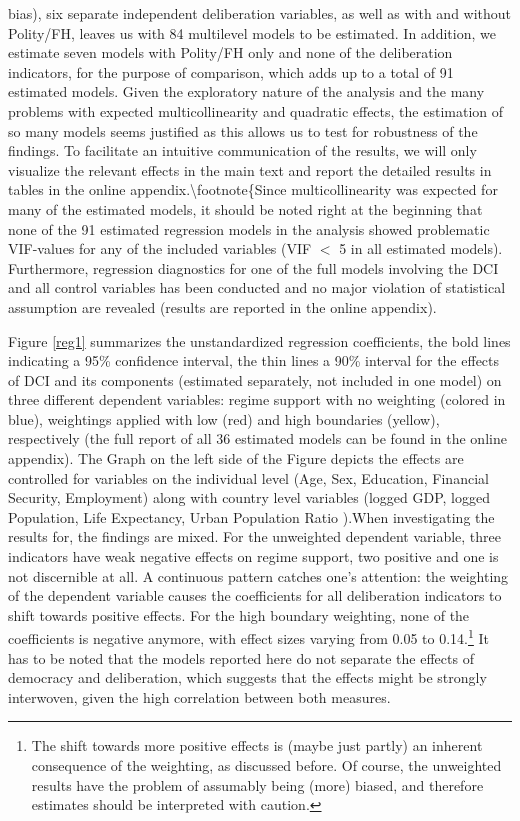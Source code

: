 \documentclass[]{article}
\let\rmarkdownfootnote\footnote%
\def\footnote{\protect\rmarkdownfootnote}
\begin{document}
bias), six separate independent deliberation variables, as well as with
and without Polity/FH, leaves us with 84 multilevel models to be
estimated. In addition, we estimate seven models with Polity/FH only and
none of the deliberation indicators, for the purpose of comparison,
which adds up to a total of 91 estimated models. Given the exploratory
nature of the analysis and the many problems with expected
multicollinearity and quadratic effects, the estimation of so many
models seems justified as this allows us to test for robustness of the
findings. To facilitate an intuitive communication of the results, we
will only visualize the relevant effects in the main text and report the
detailed results in tables in the online
appendix.\textbackslash{}footnote\{Since multicollinearity was expected
for many of the estimated models, it should be noted right at the
beginning that none of the 91 estimated regression models in the
analysis showed problematic VIF-values for any of the included variables
(VIF \(<\) 5 in all estimated models). Furthermore, regression
diagnostics for one of the full models involving the DCI and all control
variables has been conducted and no major violation of statistical
assumption are revealed (results are reported in the online appendix).

Figure \ref{reg1} summarizes the unstandardized regression coefficients,
the bold lines indicating a 95\% confidence interval, the thin lines a
90\% interval for the effects of DCI and its components (estimated
separately, not included in one model) on three different dependent
variables: regime support with no weighting (colored in blue),
weightings applied with low (red) and high boundaries (yellow),
respectively (the full report of all 36 estimated models can be found in
the online appendix). The Graph on the left side of the Figure depicts
the effects are controlled for variables on the individual level (Age,
Sex, Education, Financial Security, Employment) along with country level
variables (logged GDP, logged Population, Life Expectancy, Urban
Population Ratio ).When investigating the results for, the findings are
mixed. For the unweighted dependent variable, three indicators have weak
negative effects on regime support, two positive and one is not
discernible at all. A continuous pattern catches one's attention: the
weighting of the dependent variable causes the coefficients for all
deliberation indicators to shift towards positive effects. For the high
boundary weighting, none of the coefficients is negative anymore, with
effect sizes varying from 0.05 to
0.14.\footnote{The shift towards more positive effects is (maybe just partly) an inherent consequence of the weighting, as discussed before. Of course, the unweighted results have the problem of assumably being (more) biased, and therefore estimates should be interpreted with caution.}
It has to be noted that the models reported here do not separate the
effects of democracy and deliberation, which suggests that the effects
might be strongly interwoven, given the high correlation between both
measures.
\end{document}
